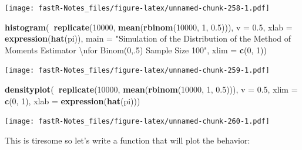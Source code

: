 \documentclass[]{book}
\newenvironment{Shaded}{\begin{snugshade}}{\end{snugshade}}
\newcommand{\KeywordTok}[1]{\textcolor[rgb]{0.13,0.29,0.53}{\textbf{#1}}}
\newcommand{\DataTypeTok}[1]{\textcolor[rgb]{0.13,0.29,0.53}{#1}}
\newcommand{\DecValTok}[1]{\textcolor[rgb]{0.00,0.00,0.81}{#1}}
\newcommand{\FloatTok}[1]{\textcolor[rgb]{0.00,0.00,0.81}{#1}}
\newcommand{\CharTok}[1]{\textcolor[rgb]{0.31,0.60,0.02}{#1}}
\newcommand{\StringTok}[1]{\textcolor[rgb]{0.31,0.60,0.02}{#1}}
\newcommand{\OperatorTok}[1]{\textcolor[rgb]{0.81,0.36,0.00}{\textbf{#1}}}
\newcommand{\NormalTok}[1]{#1}
\theoremstyle{definition}
\theoremstyle{definition}
\theoremstyle{definition}
\theoremstyle{remark}
\begin{document}
\texttt{[image: fastR-Notes\_files/figure-latex/unnamed-chunk-258-1.pdf]}

\begin{Shaded}
\begin{Highlighting}[]
\KeywordTok{histogram}\NormalTok{(}\OperatorTok{~}\KeywordTok{replicate}\NormalTok{(}\DecValTok{10000}\NormalTok{, }\KeywordTok{mean}\NormalTok{(}\KeywordTok{rbinom}\NormalTok{(}\DecValTok{10000}\NormalTok{, }\DecValTok{1}\NormalTok{, }\FloatTok{0.5}\NormalTok{))), }\DataTypeTok{v =} \FloatTok{0.5}\NormalTok{, }\DataTypeTok{xlab =} \KeywordTok{expression}\NormalTok{(}\KeywordTok{hat}\NormalTok{(pi)), }
    \DataTypeTok{main =} \StringTok{"Simulation of the Distribution of the Method of Moments Estimator }\CharTok{\textbackslash{}n}\StringTok{for Binom(0,.5) Sample Size 100"}\NormalTok{, }
    \DataTypeTok{xlim =} \KeywordTok{c}\NormalTok{(}\DecValTok{0}\NormalTok{, }\DecValTok{1}\NormalTok{))}
\end{Highlighting}
\end{Shaded}

\texttt{[image: fastR-Notes\_files/figure-latex/unnamed-chunk-259-1.pdf]}

\begin{Shaded}
\begin{Highlighting}[]
\KeywordTok{densityplot}\NormalTok{(}\OperatorTok{~}\KeywordTok{replicate}\NormalTok{(}\DecValTok{10000}\NormalTok{, }\KeywordTok{mean}\NormalTok{(}\KeywordTok{rbinom}\NormalTok{(}\DecValTok{10000}\NormalTok{, }\DecValTok{1}\NormalTok{, }\FloatTok{0.5}\NormalTok{))), }\DataTypeTok{v =} \FloatTok{0.5}\NormalTok{, }\DataTypeTok{xlim =} \KeywordTok{c}\NormalTok{(}\DecValTok{0}\NormalTok{, }
    \DecValTok{1}\NormalTok{), }\DataTypeTok{xlab =} \KeywordTok{expression}\NormalTok{(}\KeywordTok{hat}\NormalTok{(pi)))}
\end{Highlighting}
\end{Shaded}

\texttt{[image: fastR-Notes\_files/figure-latex/unnamed-chunk-260-1.pdf]}

This is tiresome so let's write a function that will plot the behavior:
\end{document}
